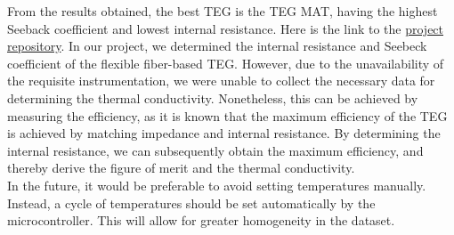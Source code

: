 \vspace{5mm}

From the results obtained, the best TEG is the TEG MAT, having the highest Seeback coefficient and lowest internal resistance. Here is the link to the \href{https://github.com/gmazzucchi/tegc}{project repository}. In our project, we determined the internal resistance and Seebeck coefficient of the flexible fiber-based TEG. However, due to the unavailability of the requisite instrumentation, we were unable to collect the necessary data for determining the thermal conductivity. Nonetheless, this can be achieved by measuring the efficiency, as it is known that the maximum efficiency of the TEG is achieved by matching impedance and internal resistance. By determining the internal resistance, we can subsequently obtain the maximum efficiency, and thereby derive the figure of merit and the thermal conductivity.\\
In the future, it would be preferable to avoid setting temperatures manually. Instead, a cycle of temperatures should be set automatically by the microcontroller. This will allow for greater homogeneity in the dataset.

